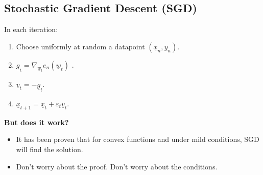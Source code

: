 \subsection{Stochastic Gradient Descent (SGD)}
\begin{definition}
    In each iteration:
    \begin{enumerate}[left=0pt]
        \item Choose uniformly at random a datapoint \( (\underline{x}_n, y_n) \).
        \item \( \underline{g}_t = \nabla_{\underline{w}_t} e_n(\underline{w}_t) \) \quad {}.
        \item \( \underline{v}_t = -\underline{g}_t \).
        \item \( \underline{x}_{t+1} = \underline{x}_t + \varepsilon_t \underline{v}_t \).
    \end{enumerate}
\end{definition}

\begin{intuition}
    \textbf{But does it work?}
    \begin{itemize}[left=0pt]
        \item It has been proven that for convex functions and under mild conditions, SGD will find the solution.
        \item Don't worry about the proof. Don't worry about the conditions.
    \end{itemize}
\end{intuition}

